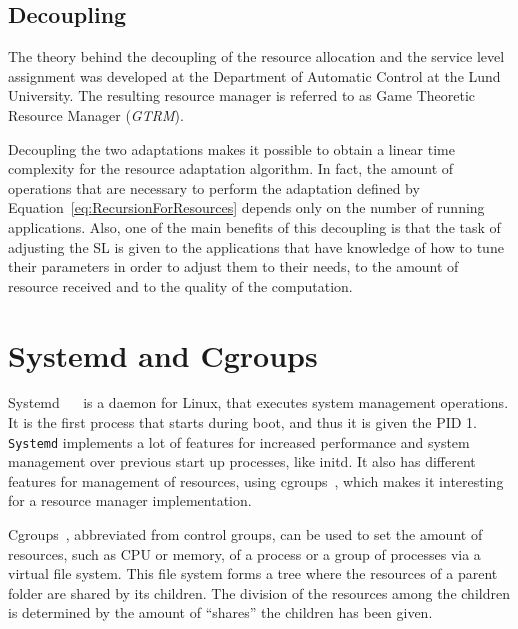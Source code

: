 \documentclass[nobiblatex]{LTHthesis}
\begin{document}
\subsection{Decoupling}

The theory behind the decoupling of the resource allocation and the service
level assignment was developed at the Department of Automatic Control at
the Lund University. The resulting resource manager is referred to as Game 
Theoretic Resource Manager (\emph{GTRM}).

Decoupling the two adaptations makes it possible to obtain a linear time
complexity for the resource adaptation algorithm. In fact, the amount of
operations that are necessary to perform the adaptation defined by
Equation~\eqref{eq:RecursionForResources} depends only on the number of
running applications. Also, one of the main benefits of this decoupling is
that the task of adjusting the SL is given to the applications that have
knowledge of how to tune their parameters in order to adjust them to their
needs, to the amount of resource received and to the quality of the 
computation.

\section{Systemd and Cgroups}
\label{sec:systemdandcroups}
Systemd ~\cite{sysd1}~\cite{sysd2} is a daemon for Linux, that executes system
management operations. It is the first process that starts during boot, and 
thus it is given the PID 1. \texttt{Systemd} implements a lot of features for increased
performance and system management over previous start up processes, like
initd. It also has different features for management of resources, using
cgroups~\cite{cgroups}, which makes it interesting for a resource manager
implementation. 

Cgroups~\cite{cgroups}, abbreviated from control groups, can be used to set
the amount of resources, such as CPU or memory, of a process or a group of
processes via a virtual file system. This file system forms a tree where the
resources of a parent folder are shared by its children. The division of the
resources among the children is determined by the amount of ``shares'' the
children has been given. 
\end{document}
